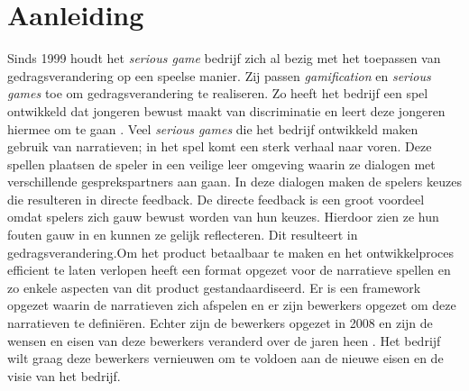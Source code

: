 \chapter{Aanleiding}
Sinds 1999 houdt het \emph{serious game} bedrijf \organisation{} zich al bezig met het toepassen van gedragsverandering op een speelse manier. Zij passen \emph{gamification} en \emph{serious games} toe om gedragsverandering te realiseren. Zo heeft het bedrijf een spel ontwikkeld dat jongeren bewust maakt van discriminatie en leert deze jongeren hiermee om te gaan \cite{fairplay}. Veel \emph{serious games} die het bedrijf ontwikkeld maken gebruik van narratieven; in het spel komt een sterk verhaal naar voren. Deze spellen plaatsen de speler in een veilige leer omgeving waarin ze dialogen met verschillende gesprekspartners aan gaan. In deze dialogen maken de spelers keuzes die resulteren in directe feedback. De directe feedback is een groot voordeel omdat spelers zich gauw bewust worden van hun keuzes. Hierdoor zien ze hun fouten gauw in en kunnen ze gelijk reflecteren. Dit resulteert in gedragsverandering.Om het product betaalbaar te maken en het ontwikkelproces efficient te laten verlopen heeft \organisation{} een format opgezet voor de narratieve spellen en zo enkele aspecten van dit product gestandaardiseerd. Er is een framework opgezet waarin de narratieven zich afspelen en er zijn bewerkers opgezet om deze narratieven te definiëren. Echter zijn de bewerkers opgezet in 2008 en zijn de wensen en eisen van deze bewerkers veranderd over de jaren heen \cite{interviewivo}. Het bedrijf wilt graag deze bewerkers vernieuwen om te voldoen aan de nieuwe eisen en de visie van het bedrijf.